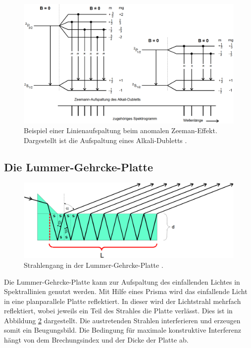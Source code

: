 \begin{figure}
	\centering
	\includegraphics[width=\linewidth-50pt,height=\textheight-50pt,keepaspectratio]{content/Images/anomaleAufspaltung.png}
    \caption{Beispiel einer Linienaufspaltung beim anomalen Zeeman-Effekt. Dargestellt ist die Aufspaltung eines Alkali-Du­bletts \cite{V27}.}
    \label{fig:anomaleAufspaltung}
\end{figure}

\subsection{Die Lummer-Gehrcke-Platte}
\begin{figure}
	\centering
	\includegraphics[width=\linewidth-50pt,height=\textheight-50pt,keepaspectratio]{content/Images/lummerPlatte.png}
    \caption{Strahlengang in der Lummer-Gehrcke-Platte \cite{V27}.}
    \label{fig:lummerPlatte}
\end{figure}
Die Lummer-Gehrcke-Platte kann zur Aufspaltung des einfallenden Lichtes in Spektrallinien genutzt werden. Mit Hilfe eines Prisma wird das einfallende Licht in eine planparallele Platte reflektiert. In dieser wird der Lichtstrahl mehrfach reflektiert, wobei jeweils ein Teil des Strahles die Platte verlässt. Dies ist in Abbildung \ref{fig:lummerPlatte} dargestellt. Die austretenden Strahlen interferieren und erzeugen somit ein Beugungsbild. Die Bedingung für maximale konstruktive Interferenz hängt von dem Brechungsindex und der Dicke der Platte ab.